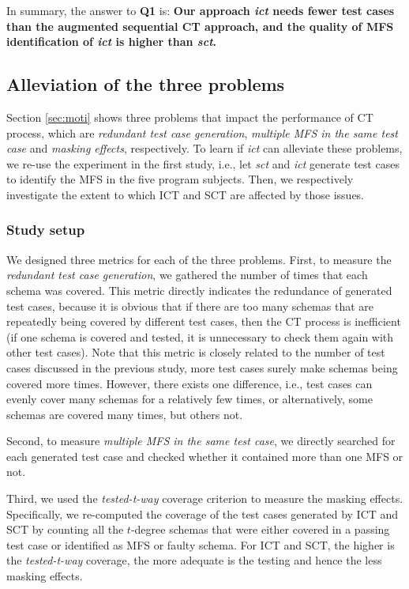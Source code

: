 \documentclass[10pt,journal,compsoc]{IEEEtran}
\begin{document}
In summary, the answer to \textbf{Q1} is:  \textbf{Our approach \emph{ict} needs fewer test cases than the augmented sequential CT approach, and the quality of MFS identification of \emph{ict} is higher than \emph{sct}.}

\subsection{Alleviation of the three problems}\label{sec:emprical:alleviation}
Section \ref{sec:moti} shows three problems that impact the performance of CT process, which are \emph{redundant test case generation}, \emph{multiple MFS in the same test case} and \emph{masking effects}, respectively. To learn if \emph{ict} can alleviate these problems, we re-use the experiment in the first study, i.e., let \emph{sct} and \emph{ict} generate test cases to identify the MFS in the five program subjects. Then, we respectively investigate the extent to which ICT and SCT are affected by those issues.

\subsubsection{Study setup}
We designed three metrics for each of the three problems. First, to measure the \emph{redundant test case generation}, we gathered the number of times that each schema was covered. This metric directly indicates the redundance of generated test cases, because it is obvious that if there are too many schemas that are repeatedly being covered by different test cases, then the CT process is inefficient (if one schema is covered and tested, it is unnecessary to check them again with other test cases). Note that this metric is closely related to the number of test cases discussed in the previous study, more test cases surely make schemas being covered more times. However, there exists one difference, i.e., test cases can evenly cover many schemas for a relatively few times, or alternatively, some schemas are covered many times, but others not.

Second, to measure \emph{multiple MFS in the same test case}, we directly searched for each generated test case and checked whether it contained more than one MFS or not.

Third, we used the \emph{tested-t-way} coverage criterion \cite{yilmaz2013reducing} to measure the masking effects. Specifically, we re-computed the coverage of the test cases generated by ICT and SCT by counting all the $t$-degree schemas that were either covered in a passing test case or identified as MFS or faulty schema. For ICT and SCT, the higher is the \emph{tested-t-way} coverage, the more adequate is the testing and hence the less masking effects.
\end{document}
